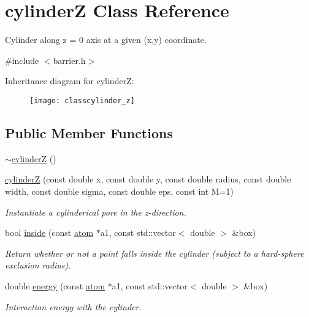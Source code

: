 \hypertarget{classcylinder_z}{\section{cylinder\-Z Class Reference}
\label{classcylinder_z}
}


Cylinder along z = 0 axis at a given (x,y) coordinate.  




{\ttfamily \#include $<$barrier.\-h$>$}

Inheritance diagram for cylinder\-Z\-:\begin{figure}[H]
\begin{center}
\leavevmode
\texttt{[image: classcylinder\_z]}
\end{center}
\end{figure}
\subsection*{Public Member Functions}
\begin{DoxyCompactItemize}
\item 
\hyperlink{classcylinder_z_a06f3ecc97023c1806d587f93a1c6c565}{$\sim$cylinder\-Z} ()
\item 
\hyperlink{classcylinder_z_a6891adbe87a6814239c8a143e996b1b0}{cylinder\-Z} (const double x, const double y, const double radius, const double width, const double sigma, const double eps, const int M=1)
\begin{DoxyCompactList}\small\item\em Instantiate a cylinderical pore in the z-\/direction. \end{DoxyCompactList}\item 
bool \hyperlink{classcylinder_z_aff84684096c1d04d73ee894b499a0a2f}{inside} (const \hyperlink{classatom}{atom} $\ast$a1, const std\-::vector$<$ double $>$ \&box)
\begin{DoxyCompactList}\small\item\em Return whether or not a point falls inside the cylinder (subject to a hard-\/sphere exclusion radius). \end{DoxyCompactList}\item 
double \hyperlink{classcylinder_z_a0d1ec094ac9bf23b74e6f03f09477217}{energy} (const \hyperlink{classatom}{atom} $\ast$a1, const std\-::vector$<$ double $>$ \&box)
\begin{DoxyCompactList}\small\item\em Interaction energy with the cylinder. \end{DoxyCompactList}\end{DoxyCompactItemize}
